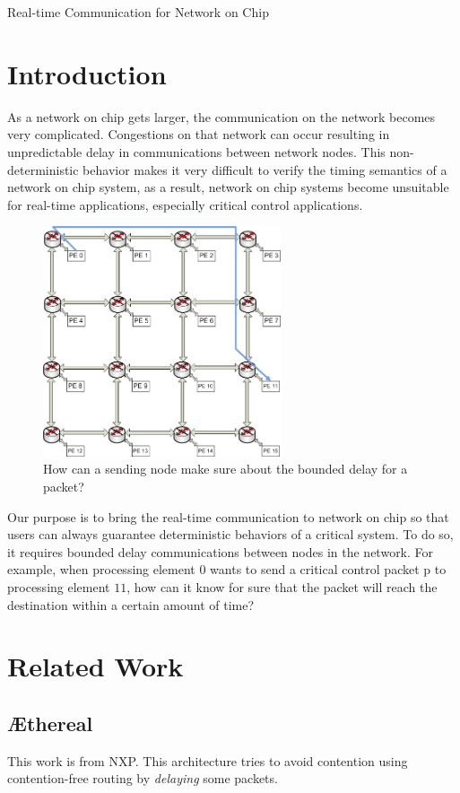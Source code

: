 \documentclass[10pt]{article}
\begin{document}
\begin{center}
\huge{Real-time Communication for Network on Chip} \hspace{0.5cm}
\end{center}
\section{Introduction}
As a network on chip gets larger, the communication on the network becomes 
very complicated. Congestions on that network can occur resulting in unpredictable 
delay in communications between network nodes. This non-deterministic behavior 
makes it very difficult to verify the timing semantics of a network on chip 
system, as a result, network on chip systems become unsuitable for real-time 
applications, especially critical control applications.

\begin{figure}[htp]\label{fig:NoCRt}
\centering
\includegraphics[width=7cm]{pics/NoC0}
\caption[Demand for a hard real-time flow.]
{How can a sending node make sure about the bounded delay for
a packet?}
\end{figure}

Our purpose is to bring the real-time communication to network on chip so that 
users can always guarantee deterministic behaviors of a critical system. To do 
so, it requires bounded delay communications between nodes in the network. 
For example, when processing element $0$ wants to send a critical control packet 
p to processing element $11$, how can it know for sure that the packet will
reach the destination within a certain amount of time? 

\section{Related Work}
\subsection{\AE thereal}
This work \cite{Goossens_chapter4} is from NXP. This architecture tries to avoid
contention using contention-free routing by {\em delaying} some packets. 
\end{document}
